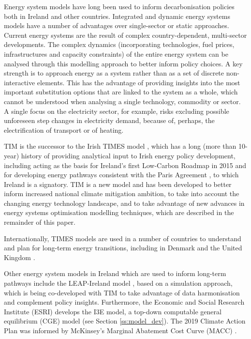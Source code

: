 \documentclass[gmd,manuscript]{copernicus}
\begin{document}
Energy system models have long been used to inform decarbonisation policies both in Ireland and other countries. Integrated and dynamic energy systems models have a number of advantages over single-sector or static approaches. Current energy systems are the result of complex country-dependent, multi-sector developments. The complex dynamics (incorporating technologies, fuel prices, infrastructures and capacity constraints) of the entire energy system can be analysed through this modelling approach to better inform policy choices. A key strength is to approach energy as a system rather than as a set of discrete non-interactive elements. This has the advantage of providing insights into the most important substitution options that are linked to the system as a whole, which cannot be understood when analysing a single technology, commodity or sector. A single focus on the electricity sector, for example, risks excluding possible unforeseen step changes in electricity demand, because of, perhaps, the electrification of transport or of heating. 

TIM is the successor to the Irish TIMES model \citep{EnvironmentalProtectionAgency2020}, which has a long (more than 10-year) history of providing analytical input to Irish energy policy development, including acting as the basis for Ireland’s first Low-Carbon Roadmap in 2015 \citep{Deane2013} and for developing energy pathways consistent with the Paris Agreement \citep{Glynn2019}, to which Ireland is a signatory. TIM is a new model and has been developed to better inform increased national climate mitigation ambition, to take into account the changing energy technology landscape, and to take advantage of new advances in energy systems optimisation modelling techniques, which are described in the remainder of this paper.

Internationally, TIMES models are used in a number of countries to understand and plan for long-term energy transitions, including in Denmark \citep{Balyk2019} and the United Kingdom \citep{fais2016impact,daly2015indirect}. 

Other energy system models in Ireland which are used to inform long-term pathways include the LEAP-Ireland model \citep{MacUidhir2020,rogan2014leaps}, based on a simulation approach, which is being co-developed with TIM to take advantage of data harmonisation and complement policy insights. Furthermore, the Economic and Social Research Institute (ESRI) develops the I3E model, a top-down computable general equilibrium (CGE) model (see Section \ref{ss:model_dev}). The 2019 Climate Action Plan was informed by McKinsey's Marginal Abatement Cost Curve (MACC) \citep{DCCAE2019}. 
\end{document}
